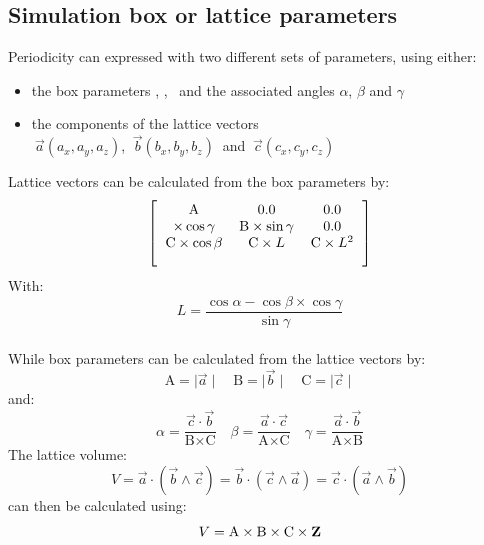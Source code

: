 \documentclass[9pt,tutorial]{livecoms}
\newcommand{\boxA}{\text{A}}
\newcommand{\boxB}{\text{B}}
\newcommand{\boxC}{\text{C}}
\begin{document}
\subsection{Simulation box or lattice parameters\label{param}}
\noindent Periodicity can expressed with two different sets of parameters, using either: 
\begin{itemize}
\item[1.]\label{abc} the box parameters \boxA, \boxB, \boxC\ and the associated angles $\alpha$, $\beta$ and $\gamma$
\item[2.]\label{uvw} the components of the lattice vectors \\
$\ \vec{a} (a_x, a_y, a_z)$, $\ \vec{b} (b_x, b_y, b_z)\ $ and $\ \vec{c} (c_x, c_y, c_z)$
\end{itemize}
Lattice vectors can be calculated from the box parameters by: \\ 
\begin{equation}
\left[ \begin{blockarray}{ccc} 
 \boxA & 0.0 & 0.0 \\
 \times \cos{\gamma} & \boxB \times \sin{\gamma} & 0.0 \\
 \boxC \times \cos{\beta} & \boxC \times L & \boxC \times L^2
\end{blockarray} \right]
\end{equation}
With:
\begin{equation}
L = \frac{\cos{\alpha} - \cos{\beta}\times\cos{\gamma}}{\sin{\gamma}}
\end{equation}
\\
While box parameters can be calculated from the lattice vectors by: 
\begin{equation}
\boxA = \mid\vec{a}\mid \quad \boxB = \mid\vec{b}\mid \quad \boxC = \mid\vec{c}\mid
\end{equation}
and: 
\begin{equation}
\alpha = \frac{\vec{c} \cdot \vec{b}}{\boxB \times \boxC} \quad \beta = \frac{\vec{a} \cdot \vec{c}}{\boxA \times \boxC} \quad \gamma = \frac{\vec{a} \cdot \vec{b}}{\boxA \times \boxB}
\end{equation}
The lattice volume:
\begin{equation}
V = {\vec{a}}\cdot ({\vec{b}}\wedge {\vec{c}})={\vec{b}}\cdot ({\vec{c}}\wedge {\vec{a}})={\vec{c}}\cdot ({\vec{a}}\wedge {\vec{b}})
\end{equation}
can then be calculated using:
\begin{equation}
V = \boxA \times \boxB \times \boxC \times {\bf{Z}} 
\end{equation}
\end{document}
